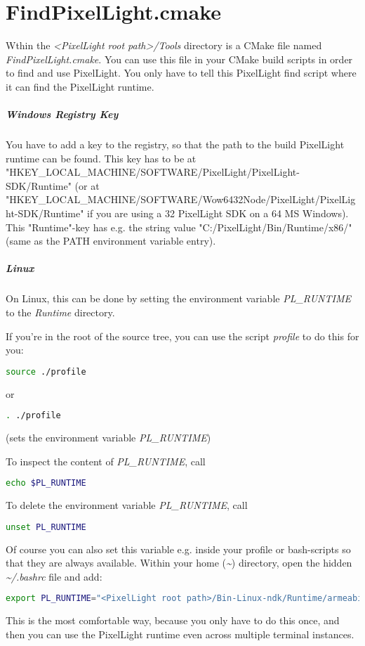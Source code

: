 \chapter{FindPixelLight.cmake}
\label{Appendix:FindPixelLight}
Wthin the \emph{<PixelLight root path>/Tools} directory is a CMake file named \emph{FindPixelLight.cmake}. You can use this file in your CMake build scripts in order to find and use PixelLight. You only have to tell this PixelLight find script where it can find the PixelLight runtime.


\paragraph{Windows Registry Key}
You have to add a key to the registry, so that the path to the build PixelLight runtime can be found. This key has to be at "HKEY\_LOCAL\_MACHINE/SOFTWARE/PixelLight/PixelLight-SDK/Runtime" (or at "HKEY\_LOCAL\_MACHINE/SOFTWARE/Wow6432Node/PixelLight/PixelLight-SDK/Runtime" if you are using a \SI{32}{\bit} PixelLight SDK on a \SI{64}{\bit} MS Windows). This "Runtime"-key has e.g. the string value "C:/PixelLight/Bin/Runtime/x86/" (same as the PATH environment variable entry).


\paragraph{Linux}
On Linux, this can be done by setting the environment variable \emph{PL\_RUNTIME} to the \emph{Runtime} directory.

If you're in the root of the source tree, you can use the script \emph{profile} to do this for you:
\begin{lstlisting}[language=sh]
source ./profile
\end{lstlisting}
or
\begin{lstlisting}[language=sh]
. ./profile
\end{lstlisting}
(sets the environment variable \emph{PL\_RUNTIME})

To inspect the content of \emph{PL\_RUNTIME}, call
\begin{lstlisting}[language=sh]
echo $PL_RUNTIME
\end{lstlisting}

To delete the environment variable \emph{PL\_RUNTIME}, call
\begin{lstlisting}[language=sh]
unset PL_RUNTIME
\end{lstlisting}

Of course you can also set this variable e.g. inside your profile or bash-scripts so that they are always available. Within your home (\emph{\textasciitilde}) directory, open the hidden \emph{\textasciitilde /.bashrc} file and add:
\begin{lstlisting}[language=sh]
export PL_RUNTIME="<PixelLight root path>/Bin-Linux-ndk/Runtime/armeabi-v7a"
\end{lstlisting}
This is the most comfortable way, because you only have to do this once, and then you can use the PixelLight runtime even across multiple terminal instances.

